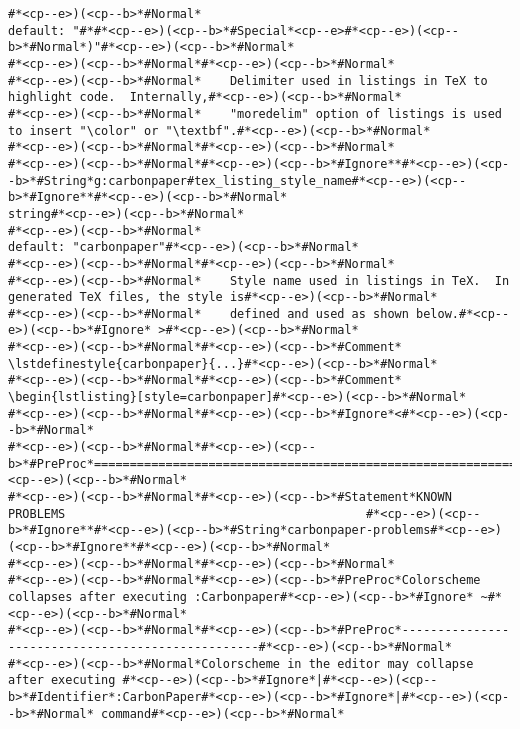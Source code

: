 \begin{lstlisting}[style=carbonpaper]
#*<cp--e>)(<cp--b>*#Normal*                                                       default: "#*#*<cp--e>)(<cp--b>*#Special*<cp--e>#*<cp--e>)(<cp--b>*#Normal*)"#*<cp--e>)(<cp--b>*#Normal*
#*<cp--e>)(<cp--b>*#Normal*#*<cp--e>)(<cp--b>*#Normal*
#*<cp--e>)(<cp--b>*#Normal*    Delimiter used in listings in TeX to highlight code.  Internally,#*<cp--e>)(<cp--b>*#Normal*
#*<cp--e>)(<cp--b>*#Normal*    "moredelim" option of listings is used to insert "\color" or "\textbf".#*<cp--e>)(<cp--b>*#Normal*
#*<cp--e>)(<cp--b>*#Normal*#*<cp--e>)(<cp--b>*#Normal*
#*<cp--e>)(<cp--b>*#Normal*#*<cp--e>)(<cp--b>*#Ignore**#*<cp--e>)(<cp--b>*#String*g:carbonpaper#tex_listing_style_name#*<cp--e>)(<cp--b>*#Ignore**#*<cp--e>)(<cp--b>*#Normal*                                  string#*<cp--e>)(<cp--b>*#Normal*
#*<cp--e>)(<cp--b>*#Normal*                                                      default: "carbonpaper"#*<cp--e>)(<cp--b>*#Normal*
#*<cp--e>)(<cp--b>*#Normal*#*<cp--e>)(<cp--b>*#Normal*
#*<cp--e>)(<cp--b>*#Normal*    Style name used in listings in TeX.  In generated TeX files, the style is#*<cp--e>)(<cp--b>*#Normal*
#*<cp--e>)(<cp--b>*#Normal*    defined and used as shown below.#*<cp--e>)(<cp--b>*#Ignore* >#*<cp--e>)(<cp--b>*#Normal*
#*<cp--e>)(<cp--b>*#Normal*#*<cp--e>)(<cp--b>*#Comment*        \lstdefinestyle{carbonpaper}{...}#*<cp--e>)(<cp--b>*#Normal*
#*<cp--e>)(<cp--b>*#Normal*#*<cp--e>)(<cp--b>*#Comment*        \begin{lstlisting}[style=carbonpaper]#*<cp--e>)(<cp--b>*#Normal*
#*<cp--e>)(<cp--b>*#Normal*#*<cp--e>)(<cp--b>*#Ignore*<#*<cp--e>)(<cp--b>*#Normal*
#*<cp--e>)(<cp--b>*#Normal*#*<cp--e>)(<cp--b>*#PreProc*==============================================================================#*<cp--e>)(<cp--b>*#Normal*
#*<cp--e>)(<cp--b>*#Normal*#*<cp--e>)(<cp--b>*#Statement*KNOWN PROBLEMS                                          #*<cp--e>)(<cp--b>*#Ignore**#*<cp--e>)(<cp--b>*#String*carbonpaper-problems#*<cp--e>)(<cp--b>*#Ignore**#*<cp--e>)(<cp--b>*#Normal*
#*<cp--e>)(<cp--b>*#Normal*#*<cp--e>)(<cp--b>*#Normal*
#*<cp--e>)(<cp--b>*#Normal*#*<cp--e>)(<cp--b>*#PreProc*Colorscheme collapses after executing :Carbonpaper#*<cp--e>)(<cp--b>*#Ignore* ~#*<cp--e>)(<cp--b>*#Normal*
#*<cp--e>)(<cp--b>*#Normal*#*<cp--e>)(<cp--b>*#PreProc*--------------------------------------------------#*<cp--e>)(<cp--b>*#Normal*
#*<cp--e>)(<cp--b>*#Normal*Colorscheme in the editor may collapse after executing #*<cp--e>)(<cp--b>*#Ignore*|#*<cp--e>)(<cp--b>*#Identifier*:CarbonPaper#*<cp--e>)(<cp--b>*#Ignore*|#*<cp--e>)(<cp--b>*#Normal* command#*<cp--e>)(<cp--b>*#Normal*

\end{lstlisting}
